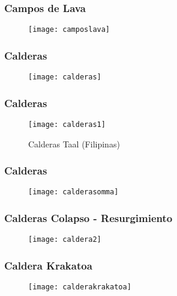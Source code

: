 \documentclass{beamer}
\begin{document}
\begin{frame}
\frametitle{Campos de Lava}
\begin{figure}
\begin{center}
\texttt{[image: camposlava]}
\end{center}
\end{figure}
\end{frame}
\begin{frame}
\frametitle{Calderas}
\begin{figure}
\begin{center}
\texttt{[image: calderas]}
\end{center}
\end{figure}
\end{frame}
\begin{frame}
\frametitle{Calderas}
\begin{figure}
\begin{center}
\texttt{[image: calderas1]}
\end{center}
\caption{Calderas Taal (Filipinas)}
\end{figure}
\end{frame}
\begin{frame}
\frametitle{Calderas}
\begin{figure}
\begin{center}
\texttt{[image: calderasomma]}
\end{center}
\end{figure}
\end{frame}
\begin{frame}
\frametitle{Calderas Colapso - Resurgimiento}
\begin{figure}
\begin{center}
\texttt{[image: caldera2]}
\end{center}
\end{figure}
\end{frame}
\begin{frame}
\frametitle{Caldera Krakatoa}
\begin{figure}
\begin{center}
\texttt{[image: calderakrakatoa]}
\end{center}
\end{figure}
\end{frame}
\end{document}
